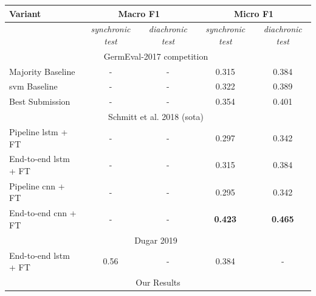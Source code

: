 \begin{table}[htp]
    \centering
    \begin{tabular*}{\textwidth}{l@{\extracolsep{\fill}}cccc@{}}
    \toprule
    Variant          & \multicolumn{2}{c}{\textbf{Macro F1}}     & \multicolumn{2}{c}{\textbf{Micro F1}}       \\ 
    \midrule
                     & \textit{synchronic test}          & \textit{diachronic test}         & \textit{synchronic test}              & \textit{diachronic test}         \\
    \midrule
                                 \multicolumn{5}{c}{GermEval-2017 competition~\cite{Wojatzki2017}}                     \\
    Majority Baseline                 &  -            &  -        & 0.315            &   0.384                             \\
    \gls{svm} Baseline                 &  -            &  -        & 0.322            &   0.389                             \\
    Best Submission                  &  -             &  -         & 0.354         & 0.401                             \\
    \midrule
                                 \multicolumn{5}{c}{Schmitt et al. 2018 {(\gls{sota})}~\cite{Schmitt2018}}         \\
    Pipeline \gls{lstm} + FT          & -            & -            & 0.297         &   0.342                            \\
    End-to-end \gls{lstm} + FT          & -            & -            & 0.315         &   0.384                             \\
    Pipeline \gls{cnn} + FT          & -            & -            & 0.295         &   0.342                             \\
    End-to-end \gls{cnn} + FT          & -            & -            & \textbf{0.423}&   \textbf{0.465}                     \\
    \midrule
    \multicolumn{5}{c}{Dugar 2019~\cite{Dugar2019}}                                                     \\
    End-to-end \gls{lstm} + FT          & 0.56            & -            &  0.384 &   -                     \\
    \midrule

                                 \multicolumn{5}{c}{Our Results}                                                     \\


\end{tabular*}
\end{table}
